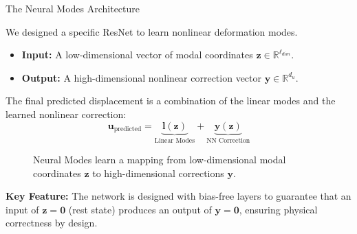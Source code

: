 \documentclass{beamer}
\begin{document}
\begin{frame}[allowframebreaks]{The Neural Modes Architecture}
    
    We designed a specific ResNet to learn nonlinear deformation modes.
    
    \begin{itemize}
        \item \textbf{Input:} A low-dimensional vector of modal coordinates \( \mathbf{z} \in \mathbb{R}^{\ell_{dim}} \).
        \item \textbf{Output:} A high-dimensional nonlinear correction vector \( \bm{y} \in \mathbb{R}^{d_u} \).
    \end{itemize}
    
    The final predicted displacement is a combination of the linear modes and the learned nonlinear correction:
    \begin{equation*}
        \bm{u}_{\text{predicted}} = \underbrace{\bm{l}(\mathbf{z})}_{\text{Linear Modes}} + \underbrace{\bm{y}(\mathbf{z})}_{\text{NN Correction}}
    \end{equation*}
    
    \begin{figure}
        \centering
        \caption{Neural Modes learn a mapping from low-dimensional modal coordinates \(\mathbf{z}\) to high-dimensional corrections \(\bm{y}\).}
        \label{fig:neural_modes_arch}
    \end{figure}
    
    \textbf{Key Feature:} The network is designed with bias-free layers to guarantee that an input of \(\mathbf{z}=\bm{0}\) (rest state) produces an output of \(\bm{y}=\bm{0}\), ensuring physical correctness by design.
\end{frame}
\end{document}
